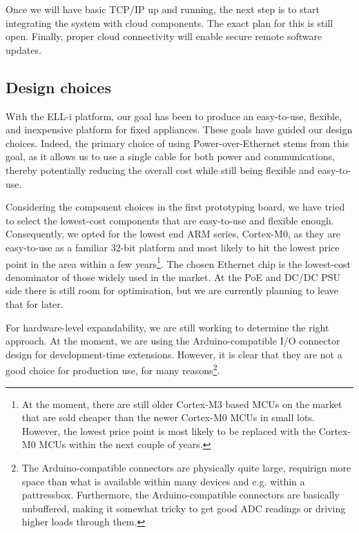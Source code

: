 \documentclass[draft,a4paper]{siamltex}
\begin{document}
Once we will have basic TCP/IP up and running, the next step is to
start integrating the system with cloud components.  The exact plan
for this is still open.  Finally, proper cloud connectivity will
enable secure remote software updates.

\subsection{Design choices}


With the ELL-i platform, our goal has been to produce an easy-to-use,
flexible, and inexpensive platform for fixed appliances.  These goals
have guided our design choices.  Indeed, the primary choice of using
Power-over-Ethernet stems from this goal, as it allows us to use a
single cable for both power and communications, thereby potentially
reducing the overall cost while still being flexible and easy-to-use.

Considering the component choices in the first prototyping board, we
have tried to select the lowest-cost components that are easy-to-use
and flexible enough.  Consequently, we opted for the lowest end ARM
series, Cortex-M0, as they are easy-to-use as a familiar 32-bit
platform and most likely to hit the lowest price point in the area
within a few years\footnote{At the moment, there are still older
  Cortex-M3 based MCUs on the market that are sold cheaper than the
  newer Cortex-M0 MCUs in small lots.  However, the lowest price
  point is most likely to be replaced with the Cortex-M0 MCUs within
  the next couple of years.}.
The chosen Ethernet chip is the lowest-cost denominator of those
widely used in the market.  At the PoE and DC/DC PSU side there is
still room for optimisation, but we are currently planning to leave
that for later.

For hardware-level expandability, we are still working to determine
the right approach.  At the moment, we are using the Arduino-compatible I/O
connector design for development-time extensions.  However, it is
clear that they are not a good choice for production use, for many
reasons\footnote{The Arduino-compatible connectors are physically quite large,
  requirign more space than what is available within many devices and
  e.g. within a pattressbox.  Furthermore, the Arduino-compatible connectors are
  basically unbuffered, making it somewhat tricky to get good ADC
  readings or driving higher loads through them.}.
\end{document}
